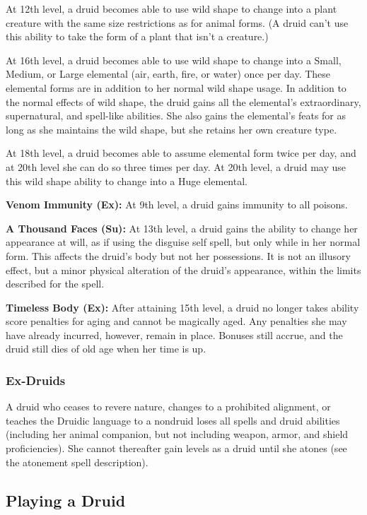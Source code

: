 At 12th level, a druid becomes able to use wild shape to change into a plant creature with the same size restrictions as for animal forms. (A druid can't use this ability to take the form of a plant that isn't a creature.)

At 16th level, a druid becomes able to use wild shape to change into a Small, Medium, or Large elemental (air, earth, fire, or water) once per day. These elemental forms are in addition to her normal wild shape usage. In addition to the normal effects of wild shape, the druid gains all the elemental's extraordinary, supernatural, and spell-like abilities. She also gains the elemental's feats for as long as she maintains the wild shape, but she retains her own creature type.

At 18th level, a druid becomes able to assume elemental form twice per day, and at 20th level she can do so three times per day. At 20th level, a druid may use this wild shape ability to change into a Huge elemental.

\textbf{Venom Immunity (Ex):} At 9th level, a druid gains immunity to all poisons.

\textbf{A Thousand Faces (Su):} At 13th level, a druid gains the ability to change her appearance at will, as if using the disguise self spell, but only while in her normal form. This affects the druid's body but not her possessions. It is not an illusory effect, but a minor physical alteration of the druid's appearance, within the limits described for the spell.

\textbf{Timeless Body (Ex):} After attaining 15th level, a druid no longer takes ability score penalties for aging and cannot be magically aged. Any penalties she may have already incurred, however, remain in place. Bonuses still accrue, and the druid still dies of old age when her time is up.

\subsubsection{Ex-Druids}

A druid who ceases to revere nature, changes to a prohibited alignment, or teaches the Druidic language to a nondruid loses all spells and druid abilities (including her animal companion, but not including weapon, armor, and shield proficiencies). She cannot thereafter gain levels as a druid until she atones (see the atonement spell description).

\subsection{Playing a Druid}

